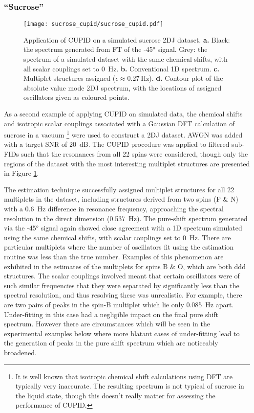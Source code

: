 \subsubsection{``Sucrose''}
\begin{figure}
    \centering
    \texttt{[image: sucrose\_cupid/sucrose\_cupid.pdf]}
    \caption[
        Application of \acs{CUPID} on a simulated sucrose \acs{2DJ} dataset.
    ]
    {
        Application of \ac{CUPID} on a simulated sucrose \ac{2DJ} dataset.
        \textbf{a.} Black: the spectrum generated from \ac{FT} of the \ang{-45}
        signal. Grey: the spectrum of a simulated dataset with the same
        chemical shifts, with all scalar couplings set to \qty{0}{\hertz}.
        \textbf{b.} Conventional \ac{1D} spectrum.
        \textbf{c.} Multiplet structures assigned ($\epsilon \approx
        \qty{0.27}{\hertz}$).
        \textbf{d.} Contour plot of the absolute value mode \ac{2DJ} spectrum,
        with the locations of assigned oscillators given as coloured points.
    }
    \label{fig:sucrose-cupid}
\end{figure}
As a second example of applying \ac{CUPID} on simulated data, the chemical
shifts and isotropic scalar couplings associated with a
Gaussian\cite{Gaussian03} \ac{DFT} calculation of sucrose in a vacuum
\footnote{
It is well known that isotropic chemical shift calculations using \ac{DFT} are
typically very inaccurate. The resulting spectrum is not typical of sucrose in
the liquid state, though this doesn't really matter for assessing the
performance of \ac{CUPID}.
}
were used to construct a 2DJ dataset. \ac{AWGN} was added with a target
\ac{SNR} of \qty{20}{\deci\bel}. The CUPID procedure was applied to filtered
sub-FIDs such that the resonances from all 22 spins were considered, though
only the regions of the dataset with the most interesting multiplet structures
are presented in Figure \ref{fig:sucrose-cupid}.

The estimation technique successfully assigned multiplet structures for all 22
multiplets in the dataset, including structures derived from two spins (F \& N)
with a \qty{0.6}{\hertz} difference in resonance frequency, approaching the
spectral resolution in the direct dimension (\qty{0.537}{\hertz}). The
pure-shift spectrum generated via the \ang{-45} signal again showed close
agreement with a 1D spectrum simulated using the same chemical shifts, with
scalar couplings set to \qty{0}{\hertz}. There are particular multiplets where
the number of oscillators fit using the estimation routine was less than the
true number. Examples of this phenomenon are exhibited in the estimates of the
multiplets for spins B \& O, which are both ddd structures. The scalar
couplings involved meant that certain oscillators were
of such similar frequencies that they were separated by significantly less than
the spectral resolution, and thus resolving these was unrealistic. For
example, there are two pairs of peaks in the spin-B multiplet which lie only
\qty{0.085}{\hertz} apart. Under-fitting in this case had a negligible impact
on the final pure shift spectrum. However there are circumstances which will be
seen in the experimental examples below where more blatant cases of under-fitting
lead to the generation of peaks in the pure shift spectrum which are noticeably
broadened.

